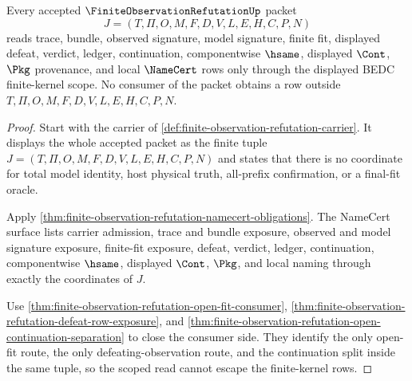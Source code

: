 \begin{theorem}
\label{thm:finite-observation-refutation-scope-exactness}
Every accepted $\FiniteObservationRefutationUp$ packet
$$
J=(T,\Pi,O,M,F,D,V,L,E,H,C,P,N)
$$
reads trace, bundle, observed signature, model signature, finite fit, displayed defeat, verdict, ledger, continuation, componentwise $\hsame$, displayed $\Cont$, $\Pkg$ provenance, and local $\NameCert$ rows only through the displayed BEDC finite-kernel scope. No consumer of the packet obtains a row outside $T,\Pi,O,M,F,D,V,L,E,H,C,P,N$.
\end{theorem}
\begin{proof}
Start with the carrier of \autoref{def:finite-observation-refutation-carrier}. It displays the whole accepted packet as the finite tuple $J=(T,\Pi,O,M,F,D,V,L,E,H,C,P,N)$ and states that there is no coordinate for total model identity, host physical truth, all-prefix confirmation, or a final-fit oracle.

Apply \autoref{thm:finite-observation-refutation-namecert-obligations}. The NameCert surface lists carrier admission, trace and bundle exposure, observed and model signature exposure, finite-fit exposure, defeat, verdict, ledger, continuation, componentwise $\hsame$, displayed $\Cont$, $\Pkg$, and local naming through exactly the coordinates of $J$.

Use \autoref{thm:finite-observation-refutation-open-fit-consumer}, \autoref{thm:finite-observation-refutation-defeat-row-exposure}, and \autoref{thm:finite-observation-refutation-open-continuation-separation} to close the consumer side. They identify the only open-fit route, the only defeating-observation route, and the continuation split inside the same tuple, so the scoped read cannot escape the finite-kernel rows.
\end{proof}


